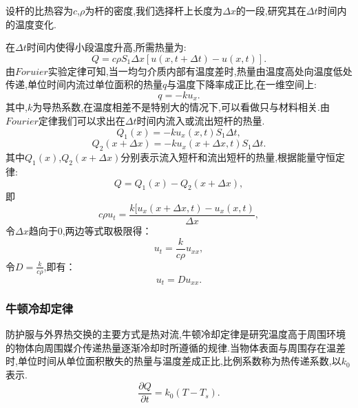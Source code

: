 \documentclass{whutmod}
\newcommand{\upcite}[1]{\textsuperscript{\textsuperscript{\cite{#1}}}}
\begin{document}
设杆的比热容为$c$,$\rho$为杆的密度,我们选择杆上长度为$\Delta x$的一段,研究其在$\Delta t$时间内的温度变化.

在$\Delta t$时间内使得小段温度升高,所需热量为:
\begin{equation}
Q=c\rho S_{1}\Delta x[u(x,t+\Delta t)-u(x,t)].
\end{equation}
由$Foruier$实验定律可知,当一均匀介质内部有温度差时,热量由温度高处向温度低处传递,单位时间内流过单位面积的热量$q$与温度下降率成正比,在一维空间上:
\begin{equation}
q=-k u_{x}.
\end{equation}
其中,$k$为导热系数,在温度相差不是特别大的情况下,可以看做只与材料相关.由$Fourier$定律我们可以求出在$\Delta t$时间内流入或流出短杆的热量.
\begin{equation}
Q_{1}(x)=-ku_{x}(x,t)S_{1}\Delta t,
\end{equation}
\begin{equation}
Q_{2}(x+\Delta x)=-ku_{x}(x+\Delta x,t)S_{1}\Delta t.
\end{equation}
其中$Q_{1}(x)$,$Q_{2}(x+\Delta x)$分别表示流入短杆和流出短杆的热量,根据能量守恒定律:
\begin{equation}
Q=Q_{1}(x)-Q_{2}(x+\Delta x),
\end{equation}
即
\begin{equation}
c\rho u_{t}=\frac{k[u_{x}(x+\Delta x,t)-u_{x}(x,t)}{\Delta x},
\end{equation}
令$\Delta x$趋向于0,两边等式取极限得：
\begin{equation}
u_{t}=\frac{k}{c\rho}u_{xx},
\end{equation}
令$D=\frac{k}{c\rho}$,即有：
\begin{equation}
u_{t}=Du_{xx}.
\end{equation}

\subsubsection{牛顿冷却定律}
防护服与外界热交换的主要方式是热对流,牛顿冷却定律是研究温度高于周围环境的物体向周围媒介传递热量逐渐冷却时所遵循的规律.当物体表面与周围存在温差时,单位时间从单位面积散失的热量与温度差成正比,比例系数称为热传递系数,以$k_{0}$表示.
\begin{equation}
\frac{\partial Q}{\partial t}=k_{0}(T-T_{s}).
\end{equation}

\end{document}

